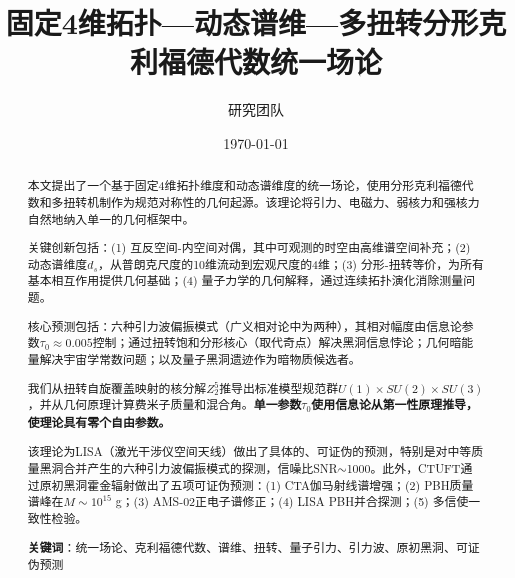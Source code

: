 \documentclass[12pt,a4paper]{revtex4-2}
\title{固定4维拓扑—动态谱维—多扭转分形克利福德代数统一场论}\\[0.5em]
\author{研究团队}
\affiliation{理论物理高级研究所}
\date{\today}
\theoremstyle{definition}
\theoremstyle{remark}
\begin{document}
\begin{abstract}
本文提出了一个基于固定4维拓扑维度和动态谱维度的统一场论，使用分形克利福德代数和多扭转机制作为规范对称性的几何起源。该理论将引力、电磁力、弱核力和强核力自然地纳入单一的几何框架中。

关键创新包括：(1) 互反空间-内空间对偶，其中可观测的时空由高维谱空间补充；(2) 动态谱维度$d_s$，从普朗克尺度的10维流动到宏观尺度的4维；(3) 分形-扭转等价，为所有基本相互作用提供几何基础；(4) 量子力学的几何解释，通过连续拓扑演化消除测量问题。

核心预测包括：六种引力波偏振模式（广义相对论中为两种），其相对幅度由信息论参数$\tau_0 \approx 0.005$控制；通过扭转饱和分形核心（取代奇点）解决黑洞信息悖论；几何暗能量解决宇宙学常数问题；以及量子黑洞遗迹作为暗物质候选者。

我们从扭转自旋覆盖映射的核分解$Z_2^5$推导出标准模型规范群$U(1) \times SU(2) \times SU(3)$，并从几何原理计算费米子质量和混合角。\textbf{单一参数$\tau_0$使用信息论从第一性原理推导，使理论具有零个自由参数。}

该理论为LISA（激光干涉仪空间天线）做出了具体的、可证伪的预测，特别是对中等质量黑洞合并产生的六种引力波偏振模式的探测，信噪比SNR$\sim$1000。此外，CTUFT通过原初黑洞霍金辐射做出了五项可证伪预测：(1) CTA伽马射线谱增强；(2) PBH质量谱峰在$M \sim 10^{15}$ g；(3) AMS-02正电子谱修正；(4) LISA PBH并合探测；(5) 多信使一致性检验。

\textbf{关键词}：统一场论、克利福德代数、谱维、扭转、量子引力、引力波、原初黑洞、可证伪预测
\end{abstract}

\maketitle

\tableofcontents
\newpage




\end{document}
